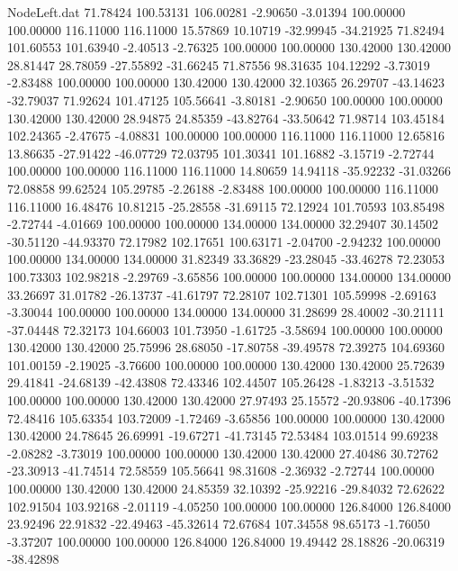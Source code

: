 \begin{filecontents}{NodeLeft.dat}
  71.78424  100.53131  106.00281    -2.90650   -3.01394  100.00000  100.00000  116.11000  116.11000   15.57869   10.10719  -32.99945  -34.21925
  71.82494  101.60553  101.63940    -2.40513   -2.76325  100.00000  100.00000  130.42000  130.42000   28.81447   28.78059  -27.55892  -31.66245
  71.87556   98.31635  104.12292    -3.73019   -2.83488  100.00000  100.00000  130.42000  130.42000   32.10365   26.29707  -43.14623  -32.79037
  71.92624  101.47125  105.56641    -3.80181   -2.90650  100.00000  100.00000  130.42000  130.42000   28.94875   24.85359  -43.82764  -33.50642
  71.98714  103.45184  102.24365    -2.47675   -4.08831  100.00000  100.00000  116.11000  116.11000   12.65816   13.86635  -27.91422  -46.07729
  72.03795  101.30341  101.16882    -3.15719   -2.72744  100.00000  100.00000  116.11000  116.11000   14.80659   14.94118  -35.92232  -31.03266
  72.08858   99.62524  105.29785    -2.26188   -2.83488  100.00000  100.00000  116.11000  116.11000   16.48476   10.81215  -25.28558  -31.69115
  72.12924  101.70593  103.85498    -2.72744   -4.01669  100.00000  100.00000  134.00000  134.00000   32.29407   30.14502  -30.51120  -44.93370
  72.17982  102.17651  100.63171    -2.04700   -2.94232  100.00000  100.00000  134.00000  134.00000   31.82349   33.36829  -23.28045  -33.46278
  72.23053  100.73303  102.98218    -2.29769   -3.65856  100.00000  100.00000  134.00000  134.00000   33.26697   31.01782  -26.13737  -41.61797
  72.28107  102.71301  105.59998    -2.69163   -3.30044  100.00000  100.00000  134.00000  134.00000   31.28699   28.40002  -30.21111  -37.04448
  72.32173  104.66003  101.73950    -1.61725   -3.58694  100.00000  100.00000  130.42000  130.42000   25.75996   28.68050  -17.80758  -39.49578
  72.39275  104.69360  101.00159    -2.19025   -3.76600  100.00000  100.00000  130.42000  130.42000   25.72639   29.41841  -24.68139  -42.43808
  72.43346  102.44507  105.26428    -1.83213   -3.51532  100.00000  100.00000  130.42000  130.42000   27.97493   25.15572  -20.93806  -40.17396
  72.48416  105.63354  103.72009    -1.72469   -3.65856  100.00000  100.00000  130.42000  130.42000   24.78645   26.69991  -19.67271  -41.73145
  72.53484  103.01514   99.69238    -2.08282   -3.73019  100.00000  100.00000  130.42000  130.42000   27.40486   30.72762  -23.30913  -41.74514
  72.58559  105.56641   98.31608    -2.36932   -2.72744  100.00000  100.00000  130.42000  130.42000   24.85359   32.10392  -25.92216  -29.84032
  72.62622  102.91504  103.92168    -2.01119   -4.05250  100.00000  100.00000  126.84000  126.84000   23.92496   22.91832  -22.49463  -45.32614
  72.67684  107.34558   98.65173    -1.76050   -3.37207  100.00000  100.00000  126.84000  126.84000   19.49442   28.18826  -20.06319  -38.42898

\end{filecontents}
